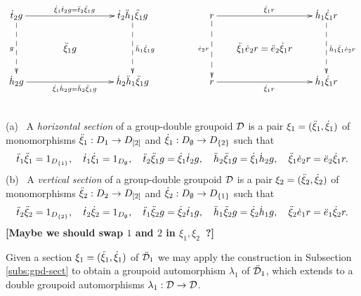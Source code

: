 $$
\xymatrix @C=3.0pc @R=1.5pc{
\dttt g \ar@{-->}[dd]_{g} \ar[rr]^{\dxo\dttt g = \ddttt\ddxo g}
  &  &  \dttt\ddhho\ddxo g \ar@{-->}[dd]^{\ddhho\ddxo g} \\
  &  \ddxo g
     & \\
\dhht g \ar[rr]_{\dxo\dhht g = \ddhht\ddxo g}
  &  &  \dhht\ddhho\ddxo g
}
\qquad\qquad
\xymatrix @C=1.5pc @R=1.5pc{
r \ar@{-->}[dd]_{\deet r} \ar[rr]^{\dxo r}
  &  &  \dhho\dxo r \ar@{-->}[dd]^{\ddhho\ddxo\deet r} \\
  &  \ddxo\deet r = \ddeet\dxo r
     & \\
r \ar[rr]_{\dxo r} 
  &  &  \dhho\dxo r
}
$$

\begin{defn}   \mbox{}\\
{\rm (a)}~
A \emph{horizontal section} of a group-double groupoid $\mathcal{D}$ 
is a pair $\xi_1 = (\ddot{\xi}_1,\dot{\xi}_1)$ of monomorphisms 
$\ddot{\xi}_1 : D_{1} \to D_{[2]}$ and $\dot{\xi}_1 : D_{\emptyset} \to D_{\{2\}}$ 
such that 
$$
\ddot{t}_1\ddot{\xi}_1 = 1_{D_{\{1\}}}, \quad
\dot{t}_1\dot{\xi}_1 = 1_{D_{\emptyset}}, \quad
\ddot{t}_2\ddot{\xi}_1 g = \dot{\xi}_1\dot{t}_2 g, \quad
\ddot{h}_2\ddot{\xi}_1 g = \dot{\xi}_1\dot{h}_2 g, \quad
\ddot{\xi}_1\dot{e}_2 r = \ddot{e}_2\dot{\xi}_1 r.
$$
{\rm (b)}~
A \emph{vertical section} of a group-double groupoid $\mathcal{D}$ 
is a pair $\xi_2 = (\ddot{\xi}_2,\dot{\xi}_2)$ of monomorphisms 
$\ddot{\xi}_2 : D_{2} \to D_{[2]}$ and $\dot{\xi}_2 : D_{\emptyset} \to D_{\{1\}}$ 
such that 
$$
\ddot{t}_2\ddot{\xi}_2 = 1_{D_{\{2\}}}, \quad
\dot{t}_2\dot{\xi}_2 = 1_{D_{\emptyset}}, \quad
\ddot{t}_1\ddot{\xi}_2 g = \dot{\xi}_2\dot{t}_1 g, \quad
\ddot{h}_1\ddot{\xi}_2 g = \dot{\xi}_2\dot{h}_1 g, \quad
\ddot{\xi}_2\dot{e}_1 r = \ddot{e}_1\dot{\xi}_2 r.
$$
{\bf [Maybe we should swap $1$ and $2$ in $\xi_1, \xi_2$~?]}
\end{defn}

\bigskip
Given a section $\xi_1 = (\ddot{\xi}_1,\dot{\xi}_1)$ of $\ddot{\mathcal{D}}_1$ 
we may apply the construction in Subsection \ref{subs:gpd-sect} 
to obtain a groupoid automorphism $\lambda_1$ of $\ddot{\mathcal{D}}_1$, 
which extends to a double groupoid automorphisms 
$\lambda_1 : \mathcal{D} \to \mathcal{D}$.

